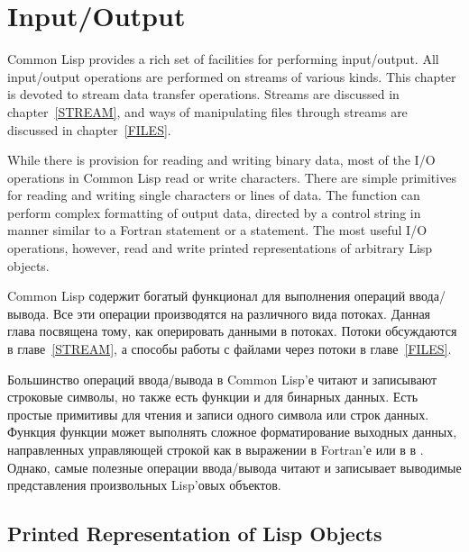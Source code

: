 
\clearpage\def\pagestatus{FINAL PROOF}

\chapter{Input/Output}
\label{IO}


Common Lisp provides a rich set of facilities for performing input/output.
All input/output operations are performed on streams of various kinds.
This chapter is devoted to stream data transfer operations.
Streams are discussed in chapter~\ref{STREAM}, and
ways of manipulating files through streams are discussed in
chapter~\ref{FILES}.

While there is provision for reading and writing binary data,
most of the I/O operations in Common Lisp read or write characters.
There are simple primitives for reading and writing single characters
or lines of data.  The  function can perform complex
formatting of output data, directed by a control string
in manner similar to a Fortran  statement
or a   statement.  The most useful I/O operations,
however, read and write printed representations of arbitrary
Lisp objects.

Common Lisp содержит богатый функционал для выполнения операций ввода/вывода.
Все эти операции производятся на различного вида потоках.
Данная глава посвящена тому, как оперировать данными в потоках.
Потоки обсуждаются в главе~\ref{STREAM}, а способы работы с файлами
через потоки в главе~\ref{FILES}.

Большинство операций ввода/вывода в Common Lisp'е читают и записывают строковые
символы, но также есть функции и для бинарных данных.
Есть простые примитивы для чтения и записи одного символа
или строк данных. Функция  функции может выполнять сложное
форматирование выходных данных, направленных управляющей строкой как в выражении
 в Fortran'е или в  в .
Однако, самые полезные операции ввода/вывода читают и записывает выводимые
представления произвольных Lisp'овых объектов.

\section{Printed Representation of Lisp Objects}

